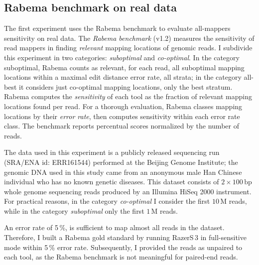 \subsection{Rabema benchmark on real data}
\label{sec:yara:eval:rabema}

The first experiment uses the Rabema benchmark to evaluate all-mappers sensitivity on real data.
The \emph{Rabema benchmark} \citep{Holtgrewe2011} (v1.2) measures the sensitivity of read mappers in finding \emph{relevant} mapping locations of genomic reads.
I subdivide this experiment in two categories: \emph{suboptimal} and \emph{co-optimal}.
In the category suboptimal, Rabema counts as relevant, for each read, all suboptimal mapping locations within a maximal edit distance error rate, \ie all strata; in the category all-best it considers just co-optimal mapping locations, \ie only the best stratum.
Rabema computes the \emph{sensitivity} of each tool as the fraction of relevant mapping locations found per read.
For a thorough evaluation, Rabema classes mapping locations by their \emph{error rate}, then computes sensitivity within each error rate class.
The benchmark reports percentual scores normalized by the number of reads.

The data used in this experiment is a publicly released sequencing run (SRA/ENA id: ERR161544) performed at the Beijing Genome Institute;
the genomic DNA used in this study came from an anonymous male Han Chinese individual who has no known genetic diseases.
This dataset consists of $2 \times 100\,\text{bp}$ whole genome sequencing reads produced by an Illumina HiSeq 2000 instrument.
For practical reasons, in the category \emph{co-optimal} I consider the first $10\,\text{M}$ reads, while in the category \emph{suboptimal} only the first $1\,\text{M}$ reads.

An error rate of 5\,\%, is sufficient to map almost all reads in the dataset.
Therefore, I built a Rabema gold standard by running RazerS\,3 in full-sensitive mode within 5\,\% error rate.
Subsequently, I provided the reads as unpaired to each tool, as the Rabema benchmark is not meaningful for paired-end reads.

